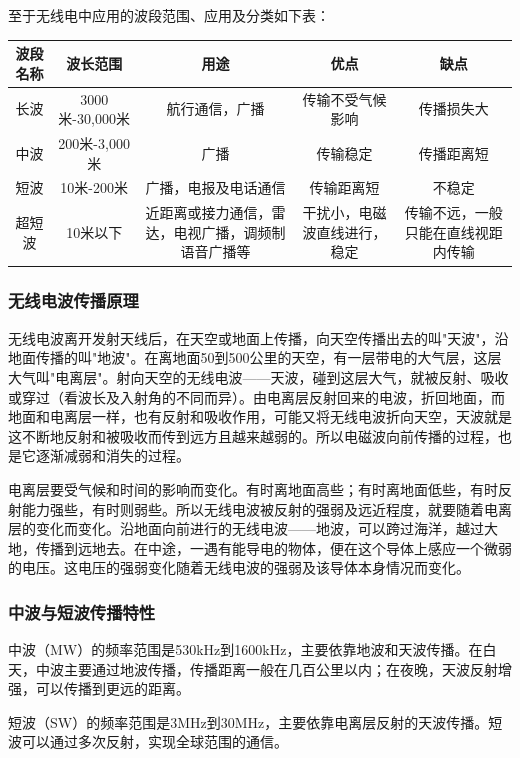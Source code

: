 \documentclass[12pt,UTF8]{ctexbook}
\begin{document}
至于无线电中应用的波段范围、应用及分类如下表：

\begin{tabular}{|c|c|c|c|c|}
\hline
\textbf{波段名称} & \textbf{波长范围} & \textbf{用途} & \textbf{优点} & \textbf{缺点} \\
\hline
长波 & 3000米-30,000米 & 航行通信，广播 & 传输不受气候影响 & 传播损失大 \\
\hline
中波 & 200米-3,000米 & 广播 & 传输稳定 & 传播距离短 \\
\hline
短波 & 10米-200米 & 广播，电报及电话通信 & 传输距离短 & 不稳定 \\
\hline
超短波 & 10米以下 & 近距离或接力通信，雷达，电视广播，调频制语音广播等 & 干扰小，电磁波直线进行，稳定 & 传输不远，一般只能在直线视距内传输 \\
\hline
\end{tabular}

\subsubsection{无线电波传播原理}

无线电波离开发射天线后，在天空或地面上传播，向天空传播出去的叫"天波"，沿地面传播的叫"地波"。在离地面50到500公里的天空，有一层带电的大气层，这层大气叫"电离层"。射向天空的无线电波——天波，碰到这层大气，就被反射、吸收或穿过（看波长及入射角的不同而异）。由电离层反射回来的电波，折回地面，而地面和电离层一样，也有反射和吸收作用，可能又将无线电波折向天空，天波就是这不断地反射和被吸收而传到远方且越来越弱的。所以电磁波向前传播的过程，也是它逐渐减弱和消失的过程。

电离层要受气候和时间的影响而变化。有时离地面高些；有时离地面低些，有时反射能力强些，有时则弱些。所以无线电波被反射的强弱及远近程度，就要随着电离层的变化而变化。沿地面向前进行的无线电波——地波，可以跨过海洋，越过大地，传播到远地去。在中途，一遇有能导电的物体，便在这个导体上感应一个微弱的电压。这电压的强弱变化随着无线电波的强弱及该导体本身情况而变化。

\subsubsection{中波与短波传播特性}

中波（MW）的频率范围是530kHz到1600kHz，主要依靠地波和天波传播。在白天，中波主要通过地波传播，传播距离一般在几百公里以内；在夜晚，天波反射增强，可以传播到更远的距离。

短波（SW）的频率范围是3MHz到30MHz，主要依靠电离层反射的天波传播。短波可以通过多次反射，实现全球范围的通信。
\end{document}
